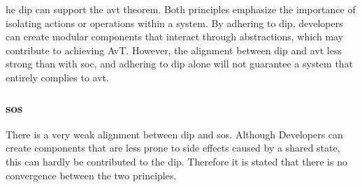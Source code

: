 he \gls{dip} can support the \gls{avt} theorem. Both principles emphasize the importance
of isolating actions or operations within a system. By adhering to \gls{dip}, developers
can create modular components that interact through abstractions, which may contribute to
achieving AvT. However, the alignment between \gls{dip} and \gls{avt} less strong than
with \gls{soc}, and adhering to \gls{dip} alone will not guarantee a system that entirely
complies to \gls{avt}.

\subsubsection{\acrlong*{sos}}

There is a very weak alignment between \gls{dip} and \gls{sos}. Although Developers can
create components that are less prone to side effects caused by a shared state, this can
hardly be contributed to the \gls{dip}. Therefore it is stated that there is no
convergence between the two principles.

